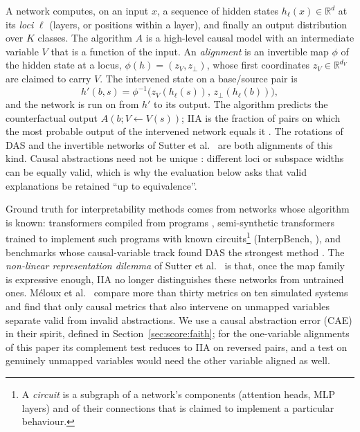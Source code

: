 \documentclass[11pt,a4paper]{article}
\newcommand{\dv}{d_V}
\begin{document}
A network computes, on an input $x$, a sequence of hidden states $h_\ell(x)\in\mathbb R^{d}$ at its \emph{loci} $\ell$ (layers, or positions within a layer), and finally an output distribution over $K$ classes. The algorithm $A$ is a high-level causal model with an intermediate variable $V$ that is a function of the input. An \emph{alignment} is an invertible map $\phi$ of the hidden state at a locus, $\phi(h)=(z_V,z_\perp)$, whose first coordinates $z_V\in\mathbb R^{\dv}$ are claimed to carry $V$. The intervened state on a base/source pair is
\begin{equation}
h'(b,s)=\phi^{-1}\bigl(z_V(h_\ell(s)),\,z_\perp(h_\ell(b))\bigr),
\label{eq:interv}
\end{equation}
and the network is run on from $h'$ to its output. The algorithm predicts the counterfactual output $A(b;V\leftarrow V(s))$; IIA is the fraction of pairs on which the most probable output of the intervened network equals it \cite{geiger2025ca}. The rotations of DAS \cite{geiger2024das} and the invertible networks of Sutter et al.\ \cite{sutter2025} are both alignments of this kind. Causal abstractions need not be unique \cite{meloux2025ident}: different loci or subspace widths can be equally valid, which is why the evaluation below asks that valid explanations be retained ``up to equivalence''.

Ground truth for interpretability methods comes from networks whose algorithm is known: transformers compiled from programs \cite{tracr2023}, semi-synthetic transformers trained to implement such programs with known circuits\footnote{A \emph{circuit} is a subgraph of a network's components (attention heads, MLP layers) and of their connections that is claimed to implement a particular behaviour.} (InterpBench, \cite{interpbench2024}), and benchmarks whose causal-variable track found DAS the strongest method \cite{mib2025}. The \emph{non-linear representation dilemma} of Sutter et al.\ \cite{sutter2025} is that, once the map family is expressive enough, IIA no longer distinguishes these networks from untrained ones. Méloux et al.\ \cite{meloux2026} compare more than thirty metrics on ten simulated systems and find that only causal metrics that also intervene on unmapped variables separate valid from invalid abstractions. We use a causal abstraction error (CAE) in their spirit, defined in Section~\ref{sec:score:faith}; for the one-variable alignments of this paper its complement test reduces to IIA on reversed pairs, and a test on genuinely unmapped variables would need the other variable aligned as well.
\end{document}
